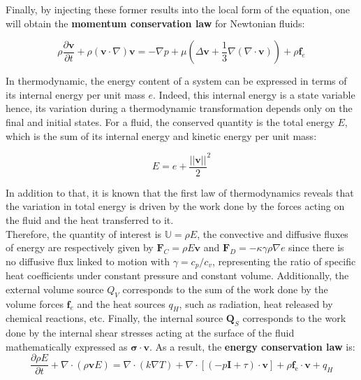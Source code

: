 Finally, by injecting these former results into the local form of the equation, one will obtain the \textbf{momentum conservation law} for Newtonian fluids:

\vspace{0.2em}
\begin{equation*}
\rho \frac{\partial \mathbf{v}}{\partial t}+\rho(\mathbf{v} \cdot \nabla) \mathbf{v}=-\nabla p+\mu\left(\Delta \mathbf{v}+\frac{1}{3} \nabla(\nabla \cdot \mathbf{v})\right)+\rho \mathbf{f}_e
\end{equation*}


In thermodynamic, the energy content of a system can be expressed in terms of its internal energy per unit mass $e$. Indeed, this internal energy is a state variable hence, its variation during a thermodynamic transformation depends only on the final and initial states. For a fluid, the conserved quantity is the total energy $E$, which is the sum of its internal energy and kinetic energy per unit mass:

\begin{equation}
E = e + \frac{||\mathbf{v}||}{2}^2
\label{C2 - EQ - Total energy per unit mass}
\end{equation}
\vspace{-0.2em}

In addition to that, it is known that the first law of thermodynamics reveals that the variation in total energy is driven by the work done by the forces acting on the fluid and the heat transferred to it. \\

Therefore, the quantity of interest is $\mathbb{U} = \rho E$, the convective and diffusive fluxes of energy are respectively given by $\mathbf{F}_{C}=\rho E\mathbf{v}$ and $\mathbf{F}_{D}= - \kappa \gamma \rho \nabla e$ since there is no diffusive flux linked to motion with $\gamma = c_p/c_v$, representing the ratio of specific heat coefficients under constant pressure and constant volume. Additionally, the external volume source $Q_V$ corresponds to the sum of the work done by the volume forces $\mathbf{f}_e$ and the heat sources $q_H$, such as radiation, heat released by chemical reactions, etc. Finally, the internal source $\mathbf{Q}_S$ corresponds to the work done by the internal shear stresses acting at the surface of the fluid mathematically expressed as $\boldsymbol{\sigma} \cdot \mathbf{v}$. As a result, the \textbf{energy conservation law} is:
\vspace{1em}
\begin{equation*}
\frac{\partial \rho E}{\partial t} + \nabla \cdot (\rho \mathbf{v} E) = \nabla \cdot (k \nabla T) + \nabla \cdot [(-p \mathbf{I} + \tau) \cdot \mathbf{v}] + \rho \mathbf{f}_{\mathrm{e}} \cdot \mathbf{v} + q_H
\end{equation*}

